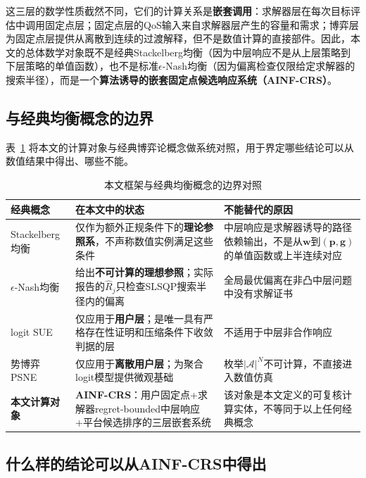 \documentclass[UTF8,11pt]{ctexart}
\newcommand{\A}{\mathcal{A}}
\newcommand{\w}{\boldsymbol{w}}
\newcommand{\p}{\boldsymbol{p}}
\newcommand{\g}{\boldsymbol{g}}
\begin{document}
这三层的数学性质截然不同，它们的计算关系是\textbf{嵌套调用}：求解器层在每次目标评估中调用固定点层；固定点层的QoS输入来自求解器层产生的容量和需求；博弈层为固定点层提供从离散到连续的过渡解释，但不是数值计算的直接部件。因此，本文的总体数学对象既不是经典Stackelberg均衡（因为中层响应不是从上层策略到下层策略的单值函数），也不是标准$\epsilon$-Nash均衡（因为偏离检查仅限给定求解器的搜索半径），而是一个\textbf{算法诱导的嵌套固定点候选响应系统（AINF-CRS）}。

\subsection{与经典均衡概念的边界}

表~\ref{tab:framework_vs_classical} 将本文的计算对象与经典博弈论概念做系统对照，用于界定哪些结论可以从数值结果中得出、哪些不能。

\begin{table}[H]
\centering
\caption{本文框架与经典均衡概念的边界对照}
\label{tab:framework_vs_classical}
\small
\begin{tabular}{@{}>{\raggedright\arraybackslash}p{}>{\raggedright\arraybackslash}p{}>{\raggedright\arraybackslash}p{}@{}}
\toprule
经典概念 & 在本文中的状态 & 不能替代的原因 \\
\midrule
Stackelberg均衡 & 仅作为额外正规条件下的\textbf{理论参照系}，不声称数值实例满足这些条件 & 中层响应是求解器诱导的路径依赖输出，不是从$\w$到$(\p,\g)$的单值函数或上半连续对应 \\
\midrule
$\epsilon$-Nash均衡 & 给出\textbf{不可计算的理想参照}；实际报告的$\widehat R_j$只检查SLSQP搜索半径内的偏离 & 全局最优偏离在非凸中层问题中没有求解证书 \\
\midrule
logit SUE & 仅应用于\textbf{用户层}；是唯一具有严格存在性证明和压缩条件下收敛判据的层 & 不适用于中层非合作响应 \\
\midrule
势博弈PSNE & 仅应用于\textbf{离散用户层}；为聚合logit模型提供微观基础 & 枚举$|\A|^N$不可计算，不直接进入数值仿真 \\
\midrule
\textbf{本文计算对象} & \textbf{AINF-CRS}：用户固定点+求解器regret-bounded中层响应+平台候选排序的三层嵌套系统 & 该对象是本文定义的可复核计算实体，不等同于以上任何经典概念 \\
\bottomrule
\end{tabular}
\end{table}

\subsection{什么样的结论可以从AINF-CRS中得出}
\end{document}
